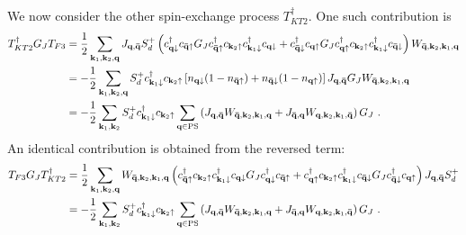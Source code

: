 \documentclass[reprint,hidelinks,onecolumn]{revtex4-2}
\begin{document}
We now consider the other spin-exchange process \(T_{KT2}^\dagger\). One such contribution is
\begin{equation}\begin{aligned}\label{kondoRenorm3}
	T_{KT2}^\dagger G_J T_{F3} &= \frac{1}{2}\sum_{{\bf k}_1,{\bf k}_2,{\bf q}} J_{{\bf q}, {\bf \bar q}}S_d^+ \left(c^\dagger_{{\bf q}\downarrow}c_{{\bf \bar q}\uparrow} G_J c^\dagger_{{\bf \bar q} \uparrow} c_{{\bf k}_2 \uparrow} c^\dagger_{{\bf k}_1 \downarrow} c_{{\bf q} \downarrow} + c^\dagger_{{\bf \bar q}\downarrow}c_{{\bf q}\uparrow}  G_J  c^\dagger_{{\bf q} \uparrow} c_{{\bf k}_2 \uparrow} c^\dagger_{{\bf k}_1 \downarrow} c_{{\bf \bar q} \downarrow}\right)W_{{\bf \bar q}, {\bf k}_2, {\bf k}_1, {\bf q}}\\
							   &= -\frac{1}{2}\sum_{{\bf k}_1,{\bf k}_2,{\bf q}} S_d^+ c^\dagger_{{\bf k}_1 \downarrow} c_{{\bf k}_2 \uparrow}\left[n_{{\bf q}\downarrow}(1 - n_{{\bf \bar q}\uparrow}) + n_{{\bf \bar q}\downarrow}(1 - n_{{\bf q}\uparrow}) \right] J_{{\bf q}, {\bf \bar q}} G_J W_{{\bf \bar q}, {\bf k}_2, {\bf k}_1, {\bf q}}\\
							   &= -\frac{1}{2}\sum_{{\bf k}_1,{\bf k}_2} S_d^+ c^\dagger_{{\bf k}_1 \downarrow} c_{{\bf k}_2 \uparrow}\sum_{{\bf q} \in \text{PS}}\left(J_{{\bf q}, {\bf \bar q}} W_{{\bf \bar q}, {\bf k}_2, {\bf k}_1, {\bf q}} + J_{{\bf \bar q}, {\bf q}} W_{{\bf q}, {\bf k}_2, {\bf k}_1, {\bf \bar q}}\right)G_J~.
\end{aligned}\end{equation}
An identical contribution is obtained from the reversed term:
\begin{equation}\begin{aligned}\label{kondoRenorm4}
	T_{F3}G_J T_{KT2}^\dagger  &= \frac{1}{2}\sum_{{\bf k}_1,{\bf k}_2,{\bf q}} W_{{\bf \bar q}, {\bf k}_2, {\bf k}_1, {\bf q}}\left(c^\dagger_{{\bf \bar q} \uparrow} c_{{\bf k}_2 \uparrow} c^\dagger_{{\bf k}_1 \downarrow} c_{{\bf q} \downarrow} G_J c^\dagger_{{\bf q}\downarrow}c_{{\bf \bar q}\uparrow} +  c^\dagger_{{\bf q} \uparrow} c_{{\bf k}_2 \uparrow} c^\dagger_{{\bf k}_1 \downarrow} c_{{\bf \bar q} \downarrow} G_J c^\dagger_{{\bf \bar q}\downarrow}c_{{\bf q}\uparrow} \right)J_{{\bf q}, {\bf \bar q}}S_d^+ \\
							   &= -\frac{1}{2}\sum_{{\bf k}_1,{\bf k}_2} S_d^+ c^\dagger_{{\bf k}_1 \downarrow} c_{{\bf k}_2 \uparrow}\sum_{{\bf q} \in \text{PS}}\left(J_{{\bf q}, {\bf \bar q}} W_{{\bf \bar q}, {\bf k}_2, {\bf k}_1, {\bf q}} + J_{{\bf \bar q}, {\bf q}} W_{{\bf q}, {\bf k}_2, {\bf k}_1, {\bf \bar q}}\right)G_J~.
\end{aligned}\end{equation}
\end{document}
